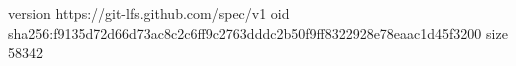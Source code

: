 version https://git-lfs.github.com/spec/v1
oid sha256:f9135d72d66d73ac8c2c6ff9c2763dddc2b50f9ff8322928e78eaac1d45f3200
size 58342
